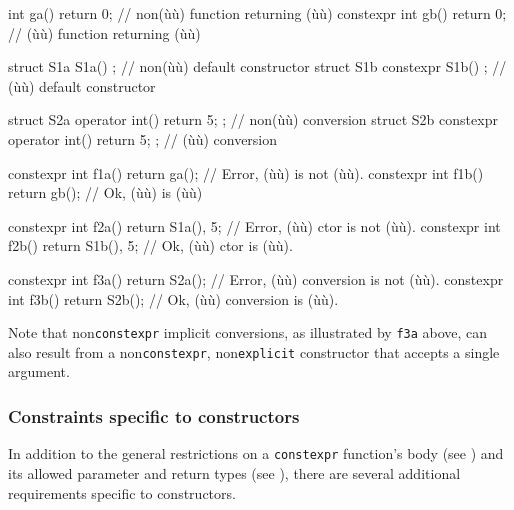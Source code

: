 \begin{emcppslisting}
          int ga() { return 0; }  // non(ù{}ù) function returning (ù{}ù)
constexpr int gb() { return 0; }  //    (ù{}ù) function returning (ù{}ù)

struct S1a {           S1a() { } };  // non(ù{}ù) default constructor
struct S1b { constexpr S1b() { } };  //    (ù{}ù) default constructor

struct S2a { operator int() { return 5; } };      // non(ù{}ù) conversion
struct S2b { constexpr operator int() { return 5; } }; // (ù{}ù) conversion

constexpr int f1a() { return ga(); }  // Error, (ù{}ù) is not (ù{}ù).
constexpr int f1b() { return gb(); }  // Ok, (ù{}ù) is (ù{}ù)

constexpr int f2a() { return S1a(), 5; }  // Error, (ù{}ù) ctor is not (ù{}ù).
constexpr int f2b() { return S1b(), 5; }  // Ok, (ù{}ù) ctor is (ù{}ù).

constexpr int f3a() { return S2a(); } // Error, (ù{}ù) conversion is not (ù{}ù).
constexpr int f3b() { return S2b(); } // Ok, (ù{}ù) conversion is (ù{}ù).
\end{emcppslisting}
    

\noindent Note that non\lstinline!constexpr! implicit conversions, as illustrated by
\lstinline!f3a! above, can also result from a non\lstinline!constexpr!,
non\lstinline!explicit! constructor that accepts a single argument.

\subsubsection[Constraints specific to constructors]{Constraints specific to constructors}\label{constraints-specific-to-constructors}

In addition to the general restrictions on a \lstinline!constexpr!
function's body (see ) and its allowed parameter and return
types (see ), there are several additional requirements specific to
constructors.

